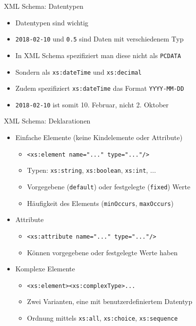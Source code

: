 \documentclass{beamer}
\begin{document}
\begin{frame}{XML Schema: Datentypen}
	
	\begin{itemize}
		\item Datentypen sind wichtig
		\item \texttt{2018-02-10} und \texttt{0.5} sind Daten mit verschiedenem Typ
		\item In XML Schema spezifiziert man diese nicht als \texttt{PCDATA}
		\item Sondern als \texttt{xs:dateTime} und \texttt{xs:decimal}
		\item Zudem spezifiziert \texttt{xs:dateTime} das Format \texttt{YYYY-MM-DD}
		\item \texttt{2018-02-10} ist somit 10. Februar, nicht 2. Oktober
	\end{itemize}
	
\end{frame}

\begin{frame}{XML Schema: Deklarationen}
	
	\begin{itemize}
		\item Einfache Elemente (keine Kindelemente oder Attribute)
		\begin{itemize}
			\item \texttt{<xs:element name="..." type="..."/>}
			\item Typen: \texttt{xs:string}, \texttt{xs:boolean}, \texttt{xs:int}, ...
			\item Vorgegebene (\texttt{default}) oder festgelegte (\texttt{fixed}) Werte
			\item Häufigkeit des Elements (\texttt{minOccurs}, \texttt{maxOccurs})
		\end{itemize}
		\item Attribute
		\begin{itemize}
			\item \texttt{<xs:attribute name="..." type="..."/>}
			\item Können vorgegebene oder festgelegte Werte haben
		\end{itemize}
		\item Komplexe Elemente
		\begin{itemize}
			\item \texttt{<xs:element><xs:complexType>...}
			\item Zwei Varianten, eine mit benutzerdefiniertem Datentyp
			\item Ordnung mittels \texttt{xs:all}, \texttt{xs:choice}, \texttt{xs:sequence}
		\end{itemize}
	\end{itemize}
	
\end{frame}
\end{document}
